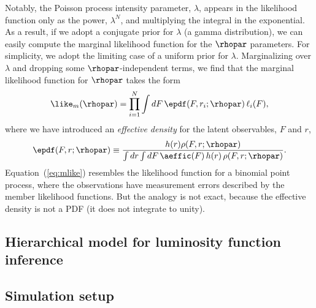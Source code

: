Notably, the Poisson process intensity parameter, $\lambda$, appears in the likelihood function only as the power, $\lambda^N$, and multiplying the integral in the exponential.
As a result, if we adopt a conjugate prior for $\lambda$ (a gamma distribution), we can easily compute the marginal likelihood function for the $\rhopar$ parameters.
For simplicity, we adopt the limiting case of a uniform prior for $\lambda$.
Marginalizing over $\lambda$ and dropping some $\rhopar$-independent terms, we find that the marginal likelihood function for $\rhopar$ takes the form
\begin{equation}\label{eq:mlike}
\like_m(\rhopar)
  = \prod_{i=1}^N \int dF\, \epdf(F,r_i;\rhopar)\, \ell_i(F),
\end{equation}
where we have introduced an \emph{effective density} for the latent observables, $F$ and $r$,
\begin{equation}\label{eq:epdf}
\epdf(F,r;\rhopar) \equiv
  \frac{h(r) \rho(F,r;\rhopar)}
    {\int dr \int dF\,\aeffic(F)\, h(r)\, \rho(F,r;\rhopar)}.
\end{equation}
Equation~(\ref{eq:mlike}) resembles the likelihood function for a binomial point process, where the observations have measurement errors described by the member likelihood functions.
But the analogy is not exact, because the effective density is not a PDF (it does not integrate to unity).




\subsection{Hierarchical model for luminosity function inference}
\label{sec:hm}



\subsection{Simulation setup}
\label{sec:simsetup}

